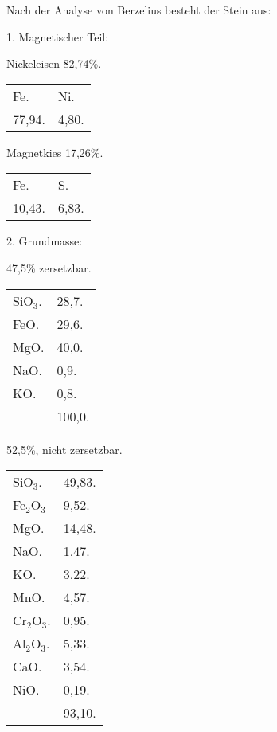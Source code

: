 \documentclass[a4paper, 11pt, oneside]{article}
\begin{document}
Nach der Analyse von Berzelius besteht der Stein aus:

1. Magnetischer Teil:
\begin{center}
Nickeleisen 82,74\%.
\end{center}

\begin{table}[!ht]
    \centering
    \begin{tabular}{l l}
        Fe. & Ni. \\
        77,94. & 4,80. \\
    \end{tabular}
\end{table}
\begin{center}
Magnetkies 17,26\%.
\end{center}
\begin{table}[!ht]
    \centering
    \begin{tabular}{l l}
        Fe. & S. \\
        10,43. & 6,83. \\
    \end{tabular}
\end{table}

2. Grundmasse:
\begin{center}
47,5\% zersetzbar.
\end{center}

\begin{table}[!ht]
    \centering
    \begin{tabular}{l l}
        SiO$_{3}$. & 28,7. \\
        FeO. & 29,6. \\
        MgO. & 40,0. \\
        NaO. & 0,9. \\
        KO. & 0,8. \\
        & 100,0. \\
    \end{tabular}
\end{table}

\begin{center}
52,5\%, nicht zersetzbar.
\end{center}
\begin{table}[!ht]
    \centering
    \begin{tabular}{l l}
        SiO$_{3}$. & 49,83. \\
        Fe$_{2}$O$_{3}$ & 9,52. \\
        MgO. & 14,48. \\
        NaO. & 1,47. \\
        KO. & 3,22. \\
        MnO. & 4,57. \\
        Cr$_{2}$O$_{3}$. & 0,95. \\
        Al$_{2}$O$_{3}$. & 5,33. \\
        CaO. & 3,54. \\
        NiO. & 0,19. \\
         &  93,10. \\
    \end{tabular}
\end{table}
\end{document}
